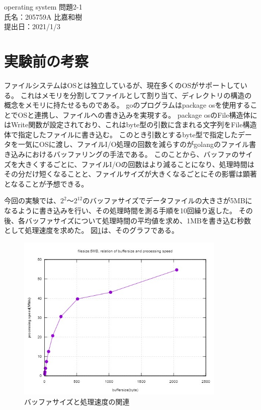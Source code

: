 \documentclass[11pt, a4paper]{jsarticle}
\begin{document}
\noindent
operating system 問題2-1\\
氏名：205759A 比嘉和樹\\
提出日：2021/1/3

\section{実験前の考察}
ファイルシステムはOSとは独立しているが、現在多くのOSがサポートしている。
これはメモリを分割してファイルとして割り当て、ディレクトリの構造の概念をメモリに持たせるものである。
goのプログラムはpackage osを使用することでOSと連携し、ファイルへの書き込みを実現する。
package osのFile構造体にはWrite関数が設定されており、これはbyte型の引数に含まれる文字列をFile構造体で指定したファイルに書き込む。
このとき引数とするbyte型で指定したデータを一気にOSに渡し、ファイルI/O処理の回数を減らすのがgolangのファイル書き込みにおけるバッファリングの手法である。
このことから、バッファのサイズを大きくするごとに、ファイルI/Oの回数はより減ることになり、処理時間はその分だけ短くなることと、ファイルサイズが大きくなるごとにその影響は顕著となることが予想できる。

今回の実験では、$2^2$～$2^{12}$のバッファサイズでデータファイルの大きさが5MBになるように書き込みを行い、その処理時間を測る手順を10回繰り返した。
その後、各バッファサイズについて処理時間の平均値を求め、1MBを書き込む秒数として処理速度を求めた。
図\ref{1}は、そのグラフである。

\begin{figure}[htbp]
	\centering
	\includegraphics[width=100mm]{../out/out.jpg}
	\caption{バッファサイズと処理速度の関連}
	\label{1}
\end{figure}
\end{document}

